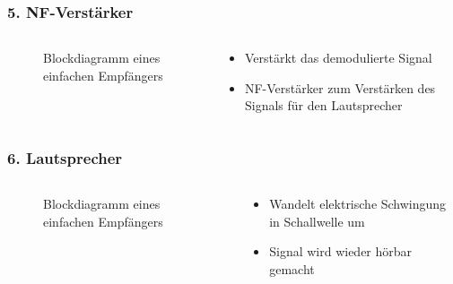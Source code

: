 \begin{frame}
\frametitle{5. NF-Verstärker}
\begin{columns}
    \begin{column}{0.48\textwidth}
    
\begin{figure}
    \caption{\scriptsize Blockdiagramm eines einfachen Empfängers}
    \label{aufbau_empfaenger_blockdiagramm}
\end{figure}


    \end{column}
   \begin{column}{0.48\textwidth}
       \begin{itemize}
  \item Verstärkt das demodulierte Signal
  \item NF-Verstärker zum Verstärken des Signals für den Lautsprecher
  \end{itemize}

   \end{column}
\end{columns}

\end{frame}

\begin{frame}
\frametitle{6. Lautsprecher}
\begin{columns}
    \begin{column}{0.48\textwidth}
    
\begin{figure}
    \caption{\scriptsize Blockdiagramm eines einfachen Empfängers}
    \label{aufbau_empfaenger_blockdiagramm}
\end{figure}


    \end{column}
   \begin{column}{0.48\textwidth}
       \begin{itemize}
  \item Wandelt elektrische Schwingung in Schallwelle um
  \item Signal wird wieder hörbar gemacht
  \end{itemize}

   \end{column}
\end{columns}

\end{frame}

\begin{frame}
\end{frame}

